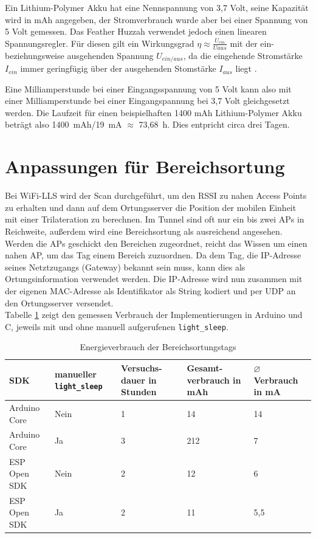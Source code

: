 Ein Lithium-Polymer Akku hat eine Nennspannung von 3,7 Volt, seine Kapazität wird in mAh angegeben, der Stromverbrauch wurde aber bei einer Spannung von 5 Volt gemessen. 
Das Feather Huzzah verwendet jedoch einen linearen Spannungsregler.
Für diesen gilt ein Wirkungsgrad $\eta \approx \frac{U_{ein}}{U{aus}}$ mit der ein- beziehungsweise ausgehenden Spannung $U_{ein/aus}$, da die eingehende Stromstärke $I_{ein}$ immer geringfügig über der ausgehenden Stomstärke $I_{aus}$ liegt \cite{streichert2012elektrik}.


Eine Milliamperstunde bei einer Eingangsspannung von 5 Volt kann also mit einer Milliamperstunde bei einer Eingangspannung bei 3,7 Volt gleichgesetzt werden.
Die Laufzeit für einen beispielhaften 1400 mAh Lithium-Polymer Akku beträgt also 1400\ mAh/19\ mA $\approx$ 73,68\ h.
Dies entpricht circa drei Tagen.


\section{Anpassungen für Bereichsortung}
\label{ch:phase1:sec:anpassungbereich}
Bei WiFi-LLS wird der Scan durchgeführt, um den RSSI zu nahen Access Points zu erhalten und dann auf dem Ortungsserver die Position der mobilen Einheit mit einer Trilateration zu berechnen.
Im Tunnel sind oft nur ein bis zwei APs in Reichweite, außerdem wird eine Bereichsortung als ausreichend angesehen. \\
Werden die APs geschickt den Bereichen zugeordnet, reicht das Wissen um einen nahen AP, um das Tag einem Bereich zuzuordnen.
Da dem Tag, die IP-Adresse seines Netztzugangs (Gateway) bekannt sein muss, kann dies als Ortungsinformation verwendet werden.
Die IP-Adresse wird nun zusammen mit der eigenen MAC-Adresse als Identifikator als String kodiert und per UDP an den Ortungsserver versendet.\\
Tabelle \ref{table:naiveconsumption} zeigt den gemessen Verbrauch der Implementierungen in Arduino und C, jeweils mit und ohne manuell aufgerufenen \texttt{light\_sleep}.

\begin{table}[h]
	\centering
	\caption{Energieverbrauch der Bereichsortungstags}
	\label{table:naiveconsumption}
	\begin{tabular}{p{3cm}|p{2.2cm}|p{1.7cm}|p{2.5cm}|p{2.5cm}}
		SDK & manueller \texttt{light\_sleep} & Versuchs-dauer in Stunden & Gesamt-verbrauch in mAh & $\varnothing$ Verbrauch in mA \\
		\hline
		Arduino Core & Nein & 1 & 14 & 14 \\
		Arduino Core & Ja & 3 & 212 & 7 \\
		ESP Open SDK & Nein & 2 & 12 & 6 \\
		ESP Open SDK & Ja & 2 & 11 & 5,5 \\
	\end{tabular}
\end{table}

